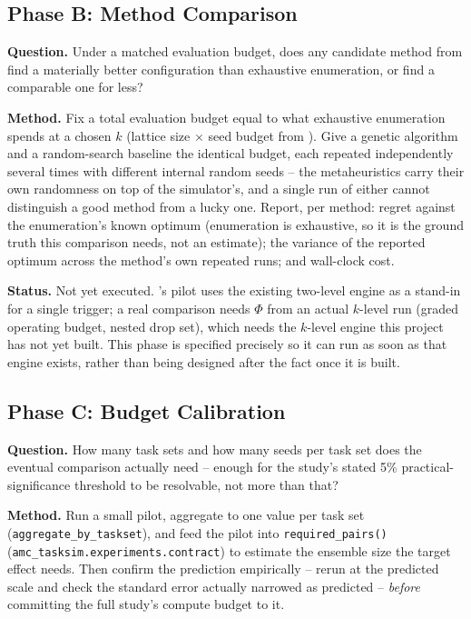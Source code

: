 \subsection{Phase B: Method Comparison}
\label{sec:phase-b}

\textbf{Question.} Under a matched evaluation budget, does any candidate
method from  find a materially better configuration
than exhaustive enumeration, or find a comparable one for less?

\textbf{Method.} Fix a total evaluation budget equal to what exhaustive
enumeration spends at a chosen $k$ (lattice size $\times$ seed budget from
). Give a genetic algorithm and a random-search baseline
the identical budget, each repeated independently several times with
different internal random seeds -- the metaheuristics carry their own
randomness on top of the simulator's, and a single run of either cannot
distinguish a good method from a lucky one. Report, per method: regret
against the enumeration's known optimum (enumeration is exhaustive, so it is
the ground truth this comparison needs, not an estimate); the variance of the
reported optimum across the method's own repeated runs; and wall-clock cost.

\textbf{Status.} Not yet executed. 's pilot uses the
existing two-level engine as a stand-in for a single trigger; a real
comparison needs $\Phi$ from an actual $k$-level run (graded operating
budget, nested drop set), which needs the $k$-level engine this project has
not yet built. This phase is specified precisely so it can run as soon as
that engine exists, rather than being designed after the fact once it is
built.

\subsection{Phase C: Budget Calibration}
\label{sec:phase-c}

\textbf{Question.} How many task sets and how many seeds per task set does
the eventual comparison actually need -- enough for the study's stated 5\%
practical-significance threshold to be resolvable, not more than that?

\textbf{Method.} Run a small pilot, aggregate to one value per task set
(\texttt{aggregate\_by\_taskset}), and feed the pilot into
\texttt{required\_pairs()} (\texttt{amc\_tasksim.experiments.contract}) to
estimate the ensemble size the target effect needs. Then confirm the
prediction empirically -- rerun at the predicted scale and check the
standard error actually narrowed as predicted -- \emph{before} committing the
full study's compute budget to it.

